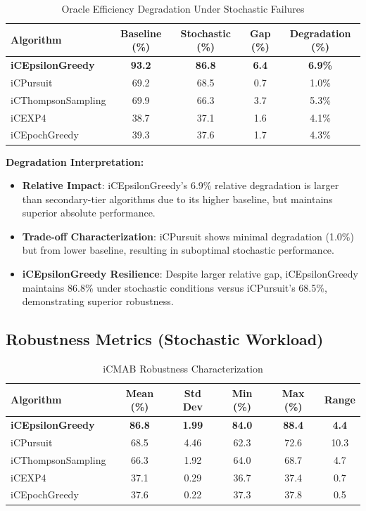 \documentclass[12pt,a4paper]{article}
\newcommand{\primarytext}[1]{\textcolor{primaryblue}{\textbf{#1}}}
\newcommand{\secondarytext}[1]{\textcolor{secondaryblue}{\textbf{#1}}}
\newcommand{\success}[1]{\textcolor{accentgreen}{\textbf{#1}}}
\begin{document}
\begin{table}[H]
\centering
\caption{Oracle Efficiency Degradation Under Stochastic Failures}
\label{tab:degradation-analysis}
\begin{tabular}{@{}lcccc@{}}
\toprule
\textbf{Algorithm} & \textbf{Baseline (\%)} & \textbf{Stochastic (\%)} & \textbf{Gap (\%)} & \textbf{Degradation (\%)} \\
\midrule
\primarytext{iCEpsilonGreedy}   & \primarytext{93.2} & \primarytext{86.8} & \primarytext{6.4} & \primarytext{6.9\%} \\
iCPursuit                       & 69.2 & 68.5 & 0.7 & 1.0\% \\
iCThompsonSampling              & 69.9 & 66.3 & 3.7 & 5.3\% \\
iCEXP4                          & 38.7 & 37.1 & 1.6 & 4.1\% \\
iCEpochGreedy                   & 39.3 & 37.6 & 1.7 & 4.3\% \\
\bottomrule
\end{tabular}
\end{table}

\textbf{Degradation Interpretation:}
\begin{itemize}
\item \primarytext{Relative Impact}: iCEpsilonGreedy's 6.9\% relative degradation is larger than secondary-tier algorithms due to its higher baseline, but maintains superior absolute performance.
\item \secondarytext{Trade-off Characterization}: iCPursuit shows minimal degradation (1.0\%) but from lower baseline, resulting in suboptimal stochastic performance.
\item \success{iCEpsilonGreedy Resilience}: Despite larger relative gap, iCEpsilonGreedy maintains 86.8\% under stochastic conditions versus iCPursuit's 68.5\%, demonstrating superior robustness.
\end{itemize}

\subsection{Robustness Metrics (Stochastic Workload)}

\begin{table}[H]
\centering
\caption{iCMAB Robustness Characterization}
\label{tab:robustness}
\begin{tabular}{@{}lccccc@{}}
\toprule
\textbf{Algorithm} & \textbf{Mean (\%)} & \textbf{Std Dev} & \textbf{Min (\%)} & \textbf{Max (\%)} & \textbf{Range} \\
\midrule
\success{iCEpsilonGreedy}   & \success{86.8} & \success{1.99} & \success{84.0} & \success{88.4} & \success{4.4} \\
iCPursuit                   & 68.5 & 4.46 & 62.3 & 72.6 & 10.3 \\
iCThompsonSampling          & 66.3 & 1.92 & 64.0 & 68.7 & 4.7 \\
iCEXP4                      & 37.1 & 0.29 & 36.7 & 37.4 & 0.7 \\
iCEpochGreedy               & 37.6 & 0.22 & 37.3 & 37.8 & 0.5 \\
\bottomrule
\end{tabular}
\end{table}
\end{document}
